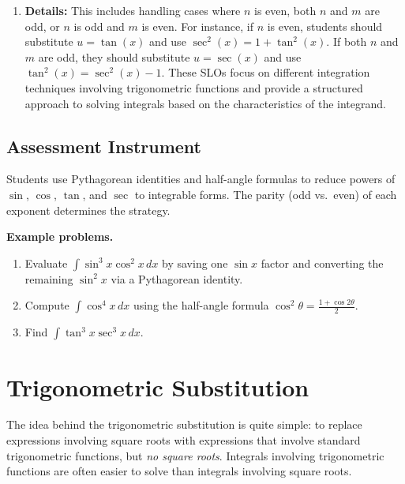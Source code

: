 \begin{enumerate}
    \item \textbf{Details:} This includes handling cases where $n$ is even, both $n$ and $m$ are odd, or $n$ is odd and $m$ is even. For instance, if $n$ is even, students should substitute $u = \tan(x)$ and use $\sec^2(x) = 1 + \tan^2(x)$. If both $n$ and $m$ are odd, they should substitute $u = \sec(x)$ and use $\tan^2(x) = \sec^2(x) - 1$. These SLOs focus on different integration techniques involving trigonometric functions and provide a structured approach to solving integrals based on the characteristics of the integrand.
\end{enumerate}

\subsection{Assessment Instrument}
\label{ssec:trig-fb0b}

Students use Pythagorean identities and half-angle formulas to reduce powers of $\sin$, $\cos$, $\tan$, and $\sec$ to integrable forms. The parity (odd vs.\ even) of each exponent determines the strategy.

\textbf{Example problems.}

\begin{enumerate}
    \item Evaluate $\int \sin^3 x\cos^2 x\,dx$ by saving one $\sin x$ factor and converting the remaining $\sin^2 x$ via a Pythagorean identity.
    \item Compute $\int \cos^4 x\,dx$ using the half-angle formula $\cos^2\theta = \tfrac{1+\cos 2\theta}{2}$.
    \item Find $\int \tan^3 x\sec^3 x\,dx$.
\end{enumerate}

\section{Trigonometric Substitution}
\label{sec:trigonometric-substitution}

The idea behind the trigonometric substitution is quite simple: to replace expressions involving square roots with expressions that involve standard trigonometric functions, but \textit{no square roots}. Integrals involving trigonometric functions are often easier to solve than integrals involving square roots.


